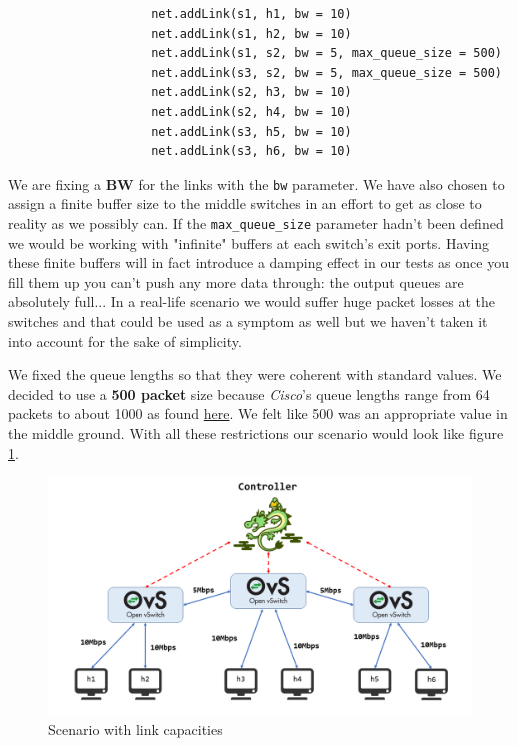 \documentclass[12pt]{report}
\newcommand{\newpar} {
    \vskip 1cm
}
\begin{document}
				\begin{verbatim}
					net.addLink(s1, h1, bw = 10)
					net.addLink(s1, h2, bw = 10)
					net.addLink(s1, s2, bw = 5, max_queue_size = 500)
					net.addLink(s3, s2, bw = 5, max_queue_size = 500)
					net.addLink(s2, h3, bw = 10)
					net.addLink(s2, h4, bw = 10)
					net.addLink(s3, h5, bw = 10)
					net.addLink(s3, h6, bw = 10)
				\end{verbatim}

				We are fixing a \textbf{BW} for the links with the \texttt{bw} parameter. We have also chosen to assign a finite buffer size to the middle switches in an effort to get as close to reality as we possibly can. If the \texttt{max\_queue\_size} parameter hadn't been defined we would be working with "infinite" buffers at each switch's exit ports. Having these finite buffers will in fact introduce a damping effect in our tests as once you fill them up you can't push any more data through: the output queues are absolutely full... In a real-life scenario we would suffer huge packet losses at the switches and that could be used as a symptom as well but we haven't taken it into account for the sake of simplicity.
				\newpar
				We fixed the queue lengths so that they were coherent with standard values. We decided to use a \textbf{500 packet} size because \textit{Cisco}'s queue lengths range from 64 packets to about 1000 as found \href{https://www.cisco.com/c/en/us/support/docs/routers/7200-series-routers/110850-queue-limit-output-drops-ios.html}{here}. We felt like 500 was an appropriate value in the middle ground. With all these restrictions our scenario would look like figure \ref{f:limited}.

				\begin{figure}
					\centering
					\includegraphics[scale = 1]{scenario_limits.png}
					\caption{Scenario with link capacities}
					\label{f:limited}
				\end{figure}
\end{document}
